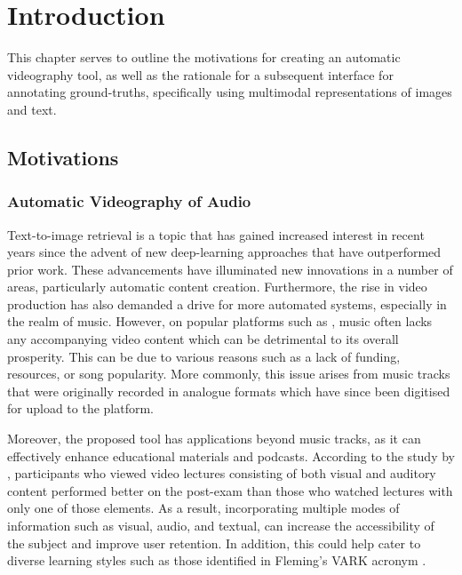 \documentclass{l4proj}
\begin{document}
\chapter{Introduction}

This chapter serves to outline the motivations for creating an automatic videography tool, as well as the rationale for a subsequent interface for annotating ground-truths, specifically using multimodal representations of images and text. 

\section{Motivations}
\subsection{Automatic Videography of Audio}
Text-to-image retrieval is a topic that has gained increased interest in recent years since the advent of new deep-learning approaches that have outperformed prior work. These advancements have illuminated new innovations in a number of areas, particularly automatic content creation. Furthermore, the rise in video production \citep{tprisevideo} has also demanded a drive for more automated systems, especially in the realm of music. However, on popular platforms such as \cite{youtube}, music often lacks any accompanying video content which can be detrimental to its overall prosperity. This can be due to various reasons such as a lack of funding, resources, or song popularity. More commonly, this issue arises from music tracks that were originally recorded in analogue formats which have since been digitised for upload to the platform.

Moreover, the proposed tool has applications beyond music tracks, as it can effectively enhance educational materials and podcasts. According to the study by \cite{benefits_of_mmv}, participants who viewed video lectures consisting of both visual and auditory content performed better on the post-exam than those who watched lectures with only one of those elements. As a result, incorporating multiple modes of information such as visual, audio, and textual, can increase the accessibility of the subject and improve user retention. In addition, this could help cater to diverse learning styles such as those identified in Fleming's VARK acronym \citep{vark}.
\end{document}
